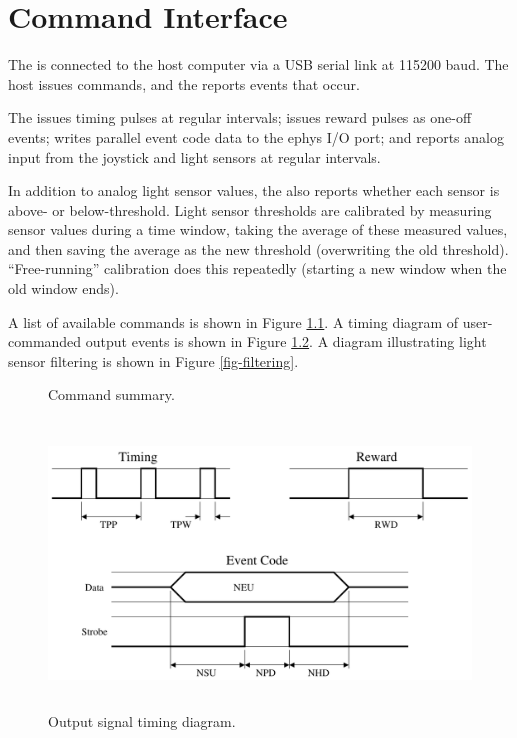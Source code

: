 %

\chapter{Command Interface}
\label{sect-commands}

The {\projectname} is connected to the host computer via a USB serial link at 
115200 baud. The host issues commands, and the {\projectname} reports events 
that occur.

The {\projectname} issues timing pulses at regular intervals; issues reward 
pulses as one-off events; writes parallel event code data to the ephys I/O
port; and reports analog input from the joystick and light sensors at regular 
intervals.

In addition to analog light sensor values, the {\projectname} also reports
whether each sensor is above- or below-threshold. Light sensor thresholds
are calibrated by measuring sensor values during a time window, taking the 
average of these measured values, and then saving the average as the new 
threshold (overwriting the old threshold). 
``Free-running'' calibration does this repeatedly (starting a new window 
when the old window ends).

A list of available commands is shown in Figure \ref{fig-commands}. A timing
diagram of user-commanded output events is shown in Figure \ref{fig-timing}.
A diagram illustrating light sensor filtering is shown in Figure
\ref{fig-filtering}.

\begin{figure}[p]

\caption{Command summary.}\label{fig-commands}
\end{figure}

\begin{figure}[p]
\begin{center}
\includegraphics[height=3in]{figs/timing.pdf}
\end{center}
\caption{Output signal timing diagram.}\label{fig-timing}
\end{figure}

